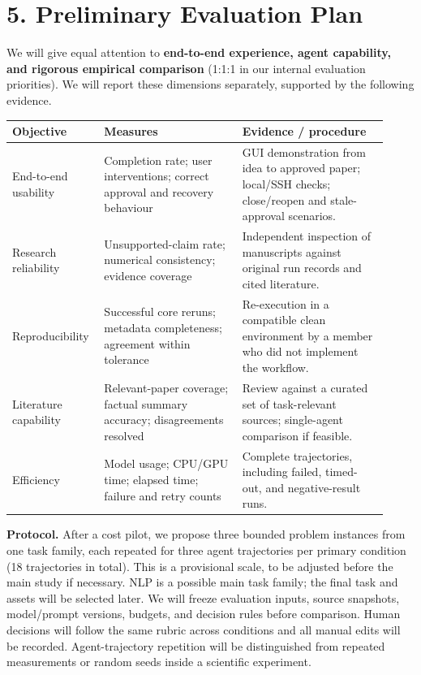\documentclass[11pt]{article}
\begin{document}
\section*{5. Preliminary Evaluation Plan}

We will give equal attention to \textbf{end-to-end experience, agent capability, and rigorous empirical comparison} (1:1:1 in our internal evaluation priorities). We will report these dimensions separately, supported by the following evidence.

\begin{center}
\small
\renewcommand{\arraystretch}{1.15}
\begin{tabular}{@{}>{\raggedright\arraybackslash}p{0.20\linewidth}>{\raggedright\arraybackslash}p{0.35\linewidth}>{\raggedright\arraybackslash}p{0.37\linewidth}@{}}
\toprule
\textbf{Objective} & \textbf{Measures} & \textbf{Evidence / procedure} \\
\midrule
End-to-end usability & Completion rate; user interventions; correct approval and recovery behaviour & GUI demonstration from idea to approved paper; local/SSH checks; close/reopen and stale-approval scenarios. \\
Research reliability & Unsupported-claim rate; numerical consistency; evidence coverage & Independent inspection of manuscripts against original run records and cited literature. \\
Reproducibility & Successful core reruns; metadata completeness; agreement within tolerance & Re-execution in a compatible clean environment by a member who did not implement the workflow. \\
Literature capability & Relevant-paper coverage; factual summary accuracy; disagreements resolved & Review against a curated set of task-relevant sources; single-agent comparison if feasible. \\
Efficiency & Model usage; CPU/GPU time; elapsed time; failure and retry counts & Complete trajectories, including failed, timed-out, and negative-result runs. \\
\bottomrule
\end{tabular}
\end{center}

\noindent\textbf{Protocol.} After a cost pilot, we propose three bounded problem instances from one task family, each repeated for three agent trajectories per primary condition (18 trajectories in total). This is a provisional scale, to be adjusted before the main study if necessary. NLP is a possible main task family; the final task and assets will be selected later. We will freeze evaluation inputs, source snapshots, model/prompt versions, budgets, and decision rules before comparison. Human decisions will follow the same rubric across conditions and all manual edits will be recorded. Agent-trajectory repetition will be distinguished from repeated measurements or random seeds inside a scientific experiment.
\end{document}
